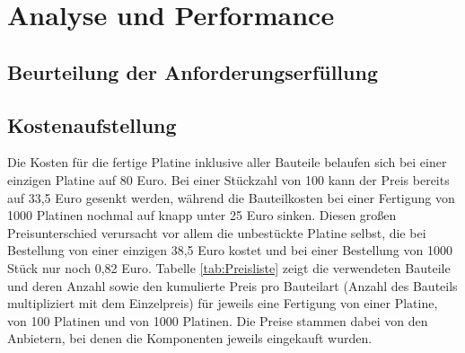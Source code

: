 \chapter{Analyse und Performance}

\section{Beurteilung der Anforderungserfüllung}

\section{Kostenaufstellung}
Die Kosten für die fertige Platine inklusive aller Bauteile belaufen sich bei einer einzigen Platine auf 80 Euro. Bei einer Stückzahl von 100 kann der Preis bereits auf 33,5 Euro gesenkt werden, während die Bauteilkosten bei einer Fertigung von 1000 Platinen nochmal auf knapp unter 25 Euro sinken. Diesen großen Preisunterschied verursacht vor allem die unbestückte Platine selbst, die bei Bestellung von einer einzigen 38,5 Euro kostet und bei einer Bestellung von 1000 Stück nur noch 0,82 Euro. Tabelle \ref{tab:Preisliste} zeigt die verwendeten Bauteile und deren Anzahl sowie den kumulierte Preis pro Bauteilart (Anzahl des Bauteils multipliziert mit dem Einzelpreis) für jeweils eine Fertigung von einer Platine, von 100 Platinen und von 1000 Platinen. Die Preise stammen dabei von den Anbietern, bei denen die Komponenten jeweils eingekauft wurden.

